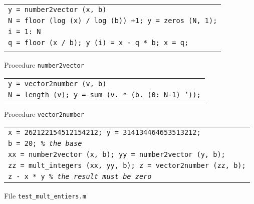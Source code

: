 \begin{listing} \begin{footnotesize}
 
 
\noindent
{\upshape
\begin{tabular}{l} \texttt{\pfunction y = number2vector (x, b)} \\
\texttt{N = floor (log (x) / log (b)) +1; y = zeros (N, 1);} \\
\texttt{\pfor i = 1: N} \\
\quad \texttt{q = floor (x / b); y (i) = x - q * b; x = q;} \\
\texttt{\pend} \\
\end{tabular}
}
 
\noindent \end{footnotesize}
 
\caption{Procedure \texttt{\upshape number2vector}}
 
\label{listing-number2vector}
\end{listing}
 
\begin{listing} \begin{footnotesize}
 
 
\noindent
{\upshape
\begin{tabular}{l} \texttt{\pfunction y = vector2number (v, b)} \\
\texttt{N = length (v); y = sum (v. * (b.{\hatverb} (0: N-1) '));} \\
\end{tabular}
}
 
\noindent \end{footnotesize}
 
\caption{Procedure \texttt{\upshape vector2number}}
 
\label{listing-vector2number}
\end{listing}
 
\begin{listing} \begin{footnotesize}
 
 
\noindent
{\upshape
\begin{tabular}{l} \texttt{x = 262122154512154212; y = 314134464653513212;} \\
\texttt{b = 20; \textit{\% the base}} \\
\texttt{xx = number2vector (x, b); yy = number2vector (y, b);} \\
\texttt{zz = mult\_integers (xx, yy, b); z = vector2number (zz, b);} \\
\texttt{z - x * y \textit{\% the result must be zero}} \\
\end{tabular}
}
 
\noindent \end{footnotesize}
 
\caption{File \texttt{test\_mult\_entiers.m}}
 
\label{listing-test-mult-integers}
\end{listing}
 
